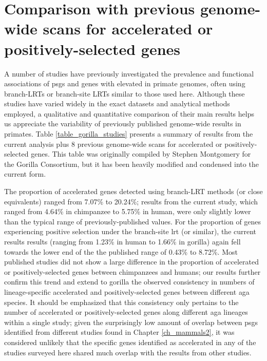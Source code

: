 \section{Comparison with previous genome-wide scans for accelerated or positively-selected genes}

A number of studies have previously investigated the prevalence and
functional associations of \acp{psg} and genes with elevated \dnds in
primate genomes, often using branch-LRTs or branch-site LRTs similar
to those used here. Although these studies have varied widely in the
exact datasets and analytical methods employed, a qualitative and
quantitative comparison of their main results helps us appreciate the
variability of previously published genome-wide results in
primates. Table \ref{table_gorilla_studies} presents a summary of
results from the current analysis plus 8 previous genome-wide scans
for accelerated or positively-selected genes. This table was
originally compiled by Stephen Montgomery for the Gorilla Consortium,
but it has been heavily modified and condensed into the current form.

The proportion of accelerated genes detected using branch-LRT methods
(or close equivalents) ranged from 7.07\% to 20.24\%; results from the
current study, which ranged from 4.64\% in chimpanzee to 5.75\% in
human, were only slightly lower than the typical range of
previously-published values. For the proportion of genes experiencing
positive selection under the branch-site \ac{lrt} (or similar), the
current results results (ranging from 1.23\% in human to 1.66\% in
gorilla) again fell towards the lower end of the the published range
of 0.43\% to 8.72\%. Most published studies did not show a large
difference in the proportion of accelerated or positively-selected
genes between chimpanzees and humans; our results further confirm this
trend and extend to gorilla the observed consistency in numbers of
lineage-specific accelerated and positively-selected genes between
different \ac{aga} species. It should be emphasized that this
consistency only pertains to the number of accelerated or
positively-selected genes along different \ac{aga} lineages within a
single study; given the surprisingly low amount of overlap between
\acp{psg} identified from different studies found in Chapter
\ref{ch_mammals2}, it was considered unlikely that the specific genes
identified as accelerated in any of the studies surveyed here shared
much overlap with the results from other studies.

